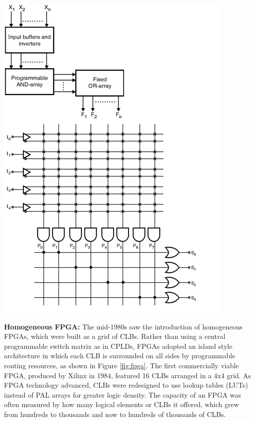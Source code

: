 {
    \centering
    \includegraphics[width=\columnwidth]{figures/pal_2.png}
    \label{fig:pal_2}
}

\newcolumn

\textbf{Homogeneous FPGA:} \quad 
The mid-1980s saw the introduction of homogeneous FPGAs, which were built as a grid of CLBs. 
Rather than using a central programmable switch matrix as in CPLDs, FPGAs adopted an island style architecture in which each CLB is surrounded on all sides by programmable routing resources, as shown in Figure \ref{fig:fpga}. 
The first commercially viable FPGA, produced by Xilinx in 1984, featured 16 CLBs arranged in a 4x4 grid. 
As FPGA technology advanced, CLBs were redesigned to use lookup tables (LUTs) instead of PAL arrays for greater logic density. 
The capacity of an FPGA was often measured by how many logical elements or CLBs it offered, which grew from hundreds to thousands and now to hundreds of thousands of CLBs.
\\ 

